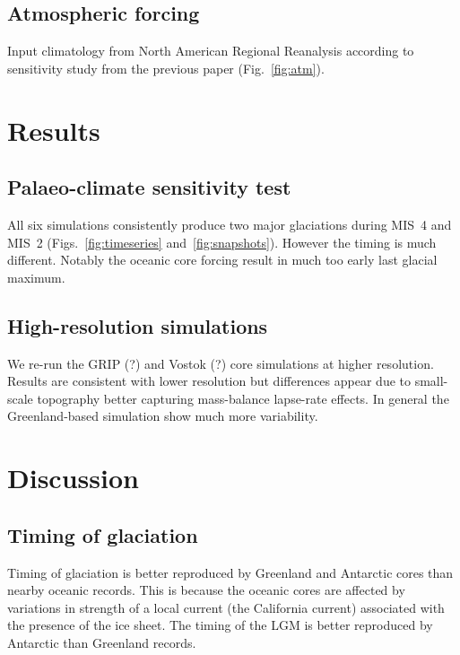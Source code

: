 \documentclass[tc, ms]{copernicus}
\begin{document}
\subsection{Atmospheric forcing}

Input climatology from North American Regional Reanalysis according to
sensitivity study from the previous paper (Fig.~\ref{fig:atm}).

\section{Results}
\label{sec:results}

\subsection{Palaeo-climate sensitivity test}

All six simulations consistently produce two major glaciations during MIS~4 and
MIS~2 (Figs.~\ref{fig:timeseries} and~\ref{fig:snapshots}).
However the timing is much different. Notably the oceanic core forcing result
in much too early last glacial maximum.

\subsection{High-resolution simulations}

We re-run the GRIP (?) and Vostok (?) core simulations at higher resolution.
Results are
consistent with lower resolution but differences appear due to small-scale
topography better capturing mass-balance lapse-rate effects. In general the
Greenland-based simulation show much more variability.

\section{Discussion}
\label{sec:discussion}

\subsection{Timing of glaciation}

Timing of glaciation is better reproduced by Greenland and Antarctic cores than
nearby oceanic records. This is because the oceanic cores are affected by
variations in strength of a local current (the California current) associated
with the presence of the ice sheet. The timing of the LGM is better reproduced
by Antarctic than Greenland records.
\end{document}
